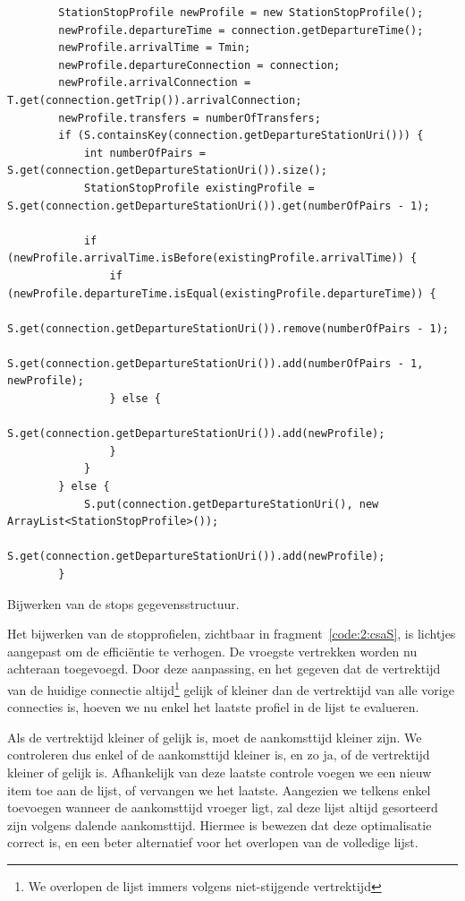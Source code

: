 \begin{listing}[h]
	\begin{verbatim}
		StationStopProfile newProfile = new StationStopProfile();
		newProfile.departureTime = connection.getDepartureTime();
		newProfile.arrivalTime = Tmin;
		newProfile.departureConnection = connection;
		newProfile.arrivalConnection = T.get(connection.getTrip()).arrivalConnection;
		newProfile.transfers = numberOfTransfers;
		if (S.containsKey(connection.getDepartureStationUri())) {
			int numberOfPairs = S.get(connection.getDepartureStationUri()).size();
			StationStopProfile existingProfile = S.get(connection.getDepartureStationUri()).get(numberOfPairs - 1);
		
			if (newProfile.arrivalTime.isBefore(existingProfile.arrivalTime)) {
				if (newProfile.departureTime.isEqual(existingProfile.departureTime)) {
					S.get(connection.getDepartureStationUri()).remove(numberOfPairs - 1);
					S.get(connection.getDepartureStationUri()).add(numberOfPairs - 1, newProfile);
				} else {
					S.get(connection.getDepartureStationUri()).add(newProfile);
				}
			}
		} else {
			S.put(connection.getDepartureStationUri(), new ArrayList<StationStopProfile>());
			S.get(connection.getDepartureStationUri()).add(newProfile);
		}
	\end{verbatim}
	\caption[CSA: Bijwerken S]{Bijwerken van de stops gegevensstructuur.}
	\label{code:2:csaS}
\end{listing}

Het bijwerken van de stopprofielen, zichtbaar in fragment~\ref{code:2:csaS}, is lichtjes aangepast om de efficiëntie te verhogen. De vroegste vertrekken worden nu achteraan toegevoegd. Door deze aanpassing, en het gegeven dat de vertrektijd van de huidige connectie altijd\footnote{We overlopen de lijst immers volgens niet-stijgende vertrektijd} gelijk of kleiner dan de vertrektijd van alle vorige connecties is, hoeven we nu enkel het laatste profiel in de lijst te evalueren.

Als de vertrektijd kleiner of gelijk is, moet de aankomsttijd kleiner zijn. We controleren dus enkel of de aankomsttijd kleiner is, en zo ja, of de vertrektijd kleiner of gelijk is. Afhankelijk van deze laatste controle voegen we een nieuw item toe aan de lijst, of vervangen we het laatste. Aangezien we telkens enkel toevoegen wanneer de aankomsttijd vroeger ligt, zal deze lijst altijd gesorteerd zijn volgens dalende aankomsttijd. Hiermee is bewezen dat deze optimalisatie correct is, en een beter alternatief voor het overlopen van de volledige lijst.


